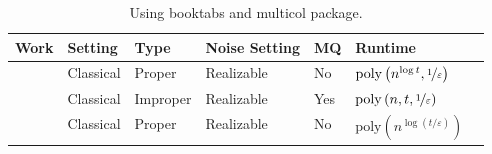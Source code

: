 \documentclass[11.5pt]{article}
\begin{document}
\begin{center}
\begin{table}[h]
  \footnotesize
  \centering
  \caption{\footnotesize 
Using booktabs and multicol package.
}
  {
    \renewcommand{\arraystretch}{2} \footnotesize
    \begin{tabular}
      {p{2cm}@{} p{1cm} p{1cm} p{2cm} p{1cm} p{2cm} p{2cm}} 
      
       \textbf{Work} & \textbf{Setting}&\textbf{Type} &\textbf{Noise Setting}&\textbf{MQ}&\textbf{Runtime}&\\
       \toprule
       ~\cite{ehrenfeucht1989learning} &Classical & Proper & \begin{minipage}{.5\textwidth}{  Realizable}\end{minipage} & \begin{minipage}{.5\textwidth}{   No}\end{minipage} & \begin{minipage}{.5\textwidth}
    {  ${\mathrm{poly}\left(n^{\log t},{\nicefrac{1}{\varepsilon}}\right)}$}
\end{minipage}&\\

       ~\cite{kushilevitz1991learning}&Classical & Improper & \begin{minipage}{.5\textwidth}{  Realizable}\end{minipage} & \begin{minipage}{.5\textwidth}{  Yes}\end{minipage} & \begin{minipage}{.5\textwidth}
     {  ${\mathrm{poly}\left(n,t,{\nicefrac{1}{\varepsilon}}\right)}$}
 \end{minipage}&\\

         ~\cite{LMN93}&Classical & Proper & \begin{minipage}{.5\textwidth}{  Realizable}\end{minipage} & \begin{minipage}{.5\textwidth}{   No}\end{minipage}& \begin{minipage}{.5\textwidth}{ ${\mathrm{poly}\left(n^{\log{\left({t}/{\varepsilon}\right)}}\right)}$}
 \end{minipage}&\\


\end{tabular}}
\end{table}
\end{center}
\end{document}
